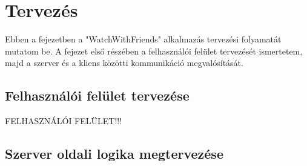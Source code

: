 \chapter{Tervez\'es}\label{chapter:tervezes}
Ebben a fejezetben a "WatchWithFriends" alkalmazás tervezési folyamatát mutatom be.
A fejezet első részében a felhasználói felület tervezését ismertetem,
majd a szerver és a kliens közötti kommunikáció megvalósítását.

\section*{Felhasználói felület tervezése}
FELHASZNÁLÓI FELÜLET!!!


\section*{Szerver oldali logika megtervezése}
